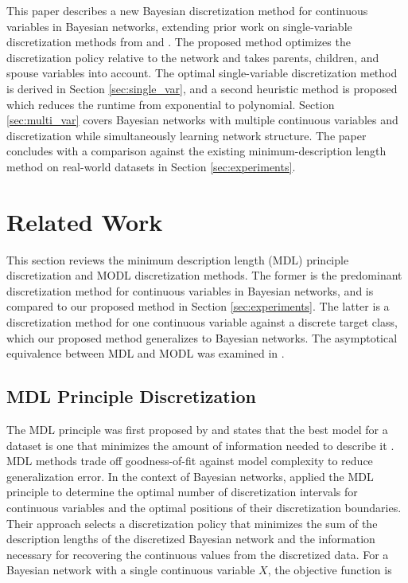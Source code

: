 This paper describes a new Bayesian discretization method for continuous variables in Bayesian networks, extending prior work on single-variable discretization methods from \citet{Boulle_2006} and \citet{Lustgarten_2011}.
The proposed method optimizes the discretization policy relative to the network and takes parents, children, and spouse variables into account.
The optimal single-variable discretization method is derived in Section \ref{sec:single_var}, and a second heuristic method is proposed which reduces the runtime from exponential to polynomial.
Section \ref{sec:multi_var} covers Bayesian networks with multiple continuous variables and discretization while simultaneously learning network structure.
The paper concludes with a comparison against the existing minimum-description length \citep{Friedman_1996} method on real-world datasets in Section \ref{sec:experiments}.


\section{Related Work}
\label{sec:related_work}
This section reviews the minimum description length (MDL) principle discretization \citep{Friedman_1996} and MODL discretization \citep{Boulle_2006} methods.
The former is the predominant discretization method for continuous variables in Bayesian networks, and is compared to our proposed method in Section \ref{sec:experiments}.
The latter is a discretization method for one continuous variable against a discrete target class, which our proposed method generalizes to Bayesian networks.
The asymptotical equivalence between MDL and MODL was examined in \citep{VL_2000}.

\subsection{MDL Principle Discretization}
The MDL principle was first proposed by \cite{MDL_1978} and states that the best model for a dataset is one that minimizes the amount of information needed to describe it \citep{Grunwald_2009}.
MDL methods trade off goodness-of-fit against model complexity to reduce generalization error.
In the context of Bayesian networks, \cite{Friedman_1996} applied the MDL principle to determine the optimal number of discretization intervals for continuous variables and the optimal positions of their discretization boundaries.
Their approach selects a discretization policy that minimizes the sum of the description lengths of the discretized Bayesian network and the information necessary for recovering the continuous values from the discretized data.
For a Bayesian network with a single continuous variable $X$, the objective function is


